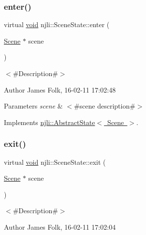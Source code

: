\subsubsection{\texorpdfstring{enter()}{enter()}}
{\footnotesize\ttfamily virtual \mbox{\hyperlink{_thread_8h_af1e856da2e658414cb2456cb6f7ebc66}{void}} njli\+::\+Scene\+State\+::enter (\begin{DoxyParamCaption}\item[{\mbox{\hyperlink{classnjli_1_1_scene}{Scene}} $\ast$}]{scene }\end{DoxyParamCaption})\hspace{0.3cm}{\ttfamily [virtual]}}



$<$\#\+Description\#$>$ 

\begin{DoxyAuthor}{Author}
James Folk, 16-\/02-\/11 17\+:02\+:48
\end{DoxyAuthor}

\begin{DoxyParams}{Parameters}
{\em scene} & $<$\#scene description\#$>$ \\
\hline
\end{DoxyParams}


Implements \mbox{\hyperlink{classnjli_1_1_abstract_state_ae10e437370dcfc3261ec0b9f350f16d8}{njli\+::\+Abstract\+State$<$ Scene $>$}}.

\mbox{\label{classnjli_1_1_scene_state_ada2a116a9ed51f7e3e0a0e9e94dc7dfd}} 
\subsubsection{\texorpdfstring{exit()}{exit()}}
{\footnotesize\ttfamily virtual \mbox{\hyperlink{_thread_8h_af1e856da2e658414cb2456cb6f7ebc66}{void}} njli\+::\+Scene\+State\+::exit (\begin{DoxyParamCaption}\item[{\mbox{\hyperlink{classnjli_1_1_scene}{Scene}} $\ast$}]{scene }\end{DoxyParamCaption})\hspace{0.3cm}{\ttfamily [virtual]}}



$<$\#\+Description\#$>$ 

\begin{DoxyAuthor}{Author}
James Folk, 16-\/02-\/11 17\+:02\+:04
\end{DoxyAuthor}

